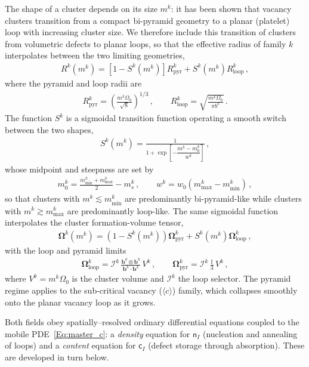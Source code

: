 \documentclass{article}
\newcommand{\spvec}[1]{\bm{\mathsf{#1}}}   %
\begin{document}
The shape of a cluster depends on its size $m^k$: it has been shown that vacancy clusters transition from a compact bi-pyramid geometry to a planar (platelet) loop with increasing cluster size. We therefore include this transition of clusters from volumetric defects to planar loops, so that the effective radius of family $k$ interpolates between the two limiting geometries,
\begin{align}\label{eq:Rtransition}
R^k(m^k)=\left[1-S^k(m^k)\right]R_{\mathrm{pyr}}^k+S^k(m^k)R_{\mathrm{loop}}^k\, ,
\end{align}
where the pyramid and loop radii are
\begin{align}\label{eq:Rpyrloop}
R_{\mathrm{pyr}}^k=\left(\frac{m^k\Omega_0}{\sqrt{8}}\right)^{1/3}\, ,\qquad R_{\mathrm{loop}}^k=\sqrt{\frac{m^k\Omega_0}{\pi b^k}}\, .
\end{align}
The function $S^k$ is a sigmoidal transition function operating a smooth switch between the two shapes,
\begin{align}\label{eq:Ssigmoid}
S^k(m^k)=\frac{1}{1+\exp\left[-\dfrac{m^k-m_0^k}{w^k}\right]}\, ,
\end{align}
whose midpoint and steepness are set by
\begin{align}\label{eq:Sparams}
m_0^k=\frac{m_{\min}^k+m_{\max}^k}{2}-m_s^k\, ,\qquad w^k=w_0\left(m_{\max}^k-m_{\min}^k\right)\, ,
\end{align}
so that clusters with $m^k\lesssim m_{\min}^k$ are predominantly bi-pyramid-like while clusters with $m^k\gtrsim m_{\max}^k$ are predominantly loop-like. The same sigmoidal function interpolates the cluster formation-volume tensor,
\begin{align}\label{eq:Omegatransition}
\bm\Omega^k(m^k)=\left(1-S^k(m^k)\right)\bm\Omega^k_{\mathrm{pyr}}+S^k(m^k)\bm\Omega^k_{\mathrm{loop}}\, ,
\end{align}
with the loop and pyramid limits
\begin{align}\label{eq:Omegalimits}
\bm\Omega^k_{\mathrm{loop}}=\mathcal{I}^k\,\frac{\bm b^k\otimes\bm b^k}{\bm b^k\cdot\bm b^k}\,V^k\, ,\qquad \bm\Omega^k_{\mathrm{pyr}}=\mathcal{I}^k\,\frac{\mathbb{I}}{3}\,V^k\, ,
\end{align}
where $V^k=m^k\Omega_0$ is the cluster volume and $\mathcal{I}^k$ the loop selector. The pyramid regime applies to the sub-critical vacancy ($\langle c\rangle$) family, which collapses smoothly onto the planar vacancy loop as it grows.

Both fields obey spatially--resolved ordinary differential equations coupled to the mobile PDE~\eqref{Eq:master_c}: a \emph{density} equation for $\spvec{n}_I$ (nucleation and annealing of loops) and a \emph{content} equation for $\spvec{c}_I$ (defect storage through absorption).  These are developed in turn below.
\end{document}
